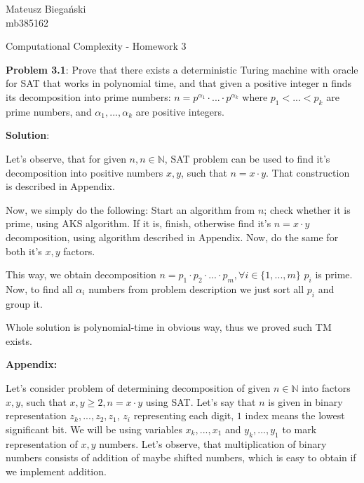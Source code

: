 \documentclass[12pt]{article}
\begin{document}

\begin{flushright}
    Mateusz Biegański \\ 
    mb385162
\end{flushright}

\begin{center}
    \Large Computational Complexity - Homework 3 \normalsize
\end{center}

\textbf{Problem 3.1}:
Prove that there exists a deterministic Turing machine with oracle for
SAT that works in polynomial time, and that given a positive integer n finds its decomposition into prime numbers:
$n = p^{\alpha_1} \cdot...\cdot p^{\alpha_k} $ where $p_1 < ... < p_k$ are prime numbers, and $\alpha_1,...,\alpha_k$ are positive integers.


{\bf Solution}:

Let's observe, that for given $n, n\in \mathbb{N}$, SAT problem can be used to find it's decomposition into positive numbers $x, y$, such that $n = x \cdot y$. That construction is described in Appendix.

Now, we simply do the following: 
Start an algorithm from $n$; check whether it is prime, using AKS algorithm. If it is, finish, otherwise find it's $n = x\cdot y$ decomposition, using algorithm described in Appendix. Now, do the same for both it's $x, y$ factors.

This way, we obtain decomposition $n = p_1 \cdot p_2 \cdot ... \cdot p_m, \forall{i \in \{1, ..., m\} }$ $p_i$ is prime. Now, to find all $\alpha_i$ numbers from problem description we just sort all $p_i$ and group it.

Whole solution is polynomial-time in obvious way, thus we proved such TM exists.


\textbf{Appendix:}

Let's consider problem of determining decomposition of given $n \in \mathbb{N}$ into factors $x,y$, such that $x, y \geq 2, n = x \cdot y$ using SAT. Let's say that $n$ is given in binary representation $z_k,...,z_2,z_1$, $z_i$ representing each digit, $1$ index means the lowest significant bit.
We will be using variables $x_k, ..., x_1$ and $y_k, ..., y_1$ to mark representation of $x, y$ numbers. Let's observe, that multiplication of binary numbers consists of addition of maybe shifted numbers, which is easy to obtain if we implement addition.
\end{document}

